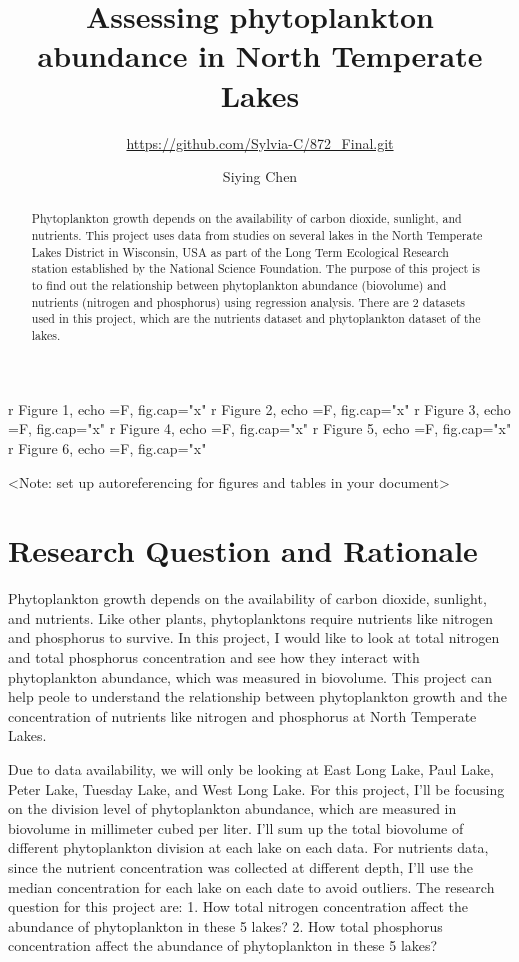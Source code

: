 \documentclass[12pt,]{article}
\title{Assessing phytoplankton abundance in North Temperate Lakes}
\subtitle{\url{https://github.com/Sylvia-C/872_Final.git}}
\author{Siying Chen}
\date{}
\begin{document}
\maketitle
\begin{abstract}
Phytoplankton growth depends on the availability of carbon dioxide,
sunlight, and nutrients. This project uses data from studies on several
lakes in the North Temperate Lakes District in Wisconsin, USA as part of
the Long Term Ecological Research station established by the National
Science Foundation. The purpose of this project is to find out the
relationship between phytoplankton abundance (biovolume) and nutrients
(nitrogen and phosphorus) using regression analysis. There are 2
datasets used in this project, which are the nutrients dataset and
phytoplankton dataset of the lakes.
\end{abstract}

\newpage

\tableofcontents  \newpage
\listoftables 

\newpage

\listoffigures 
{r Figure 1, echo =F, fig.cap="x"}
{r Figure 2, echo =F, fig.cap="x"}
{r Figure 3, echo =F, fig.cap="x"}
{r Figure 4, echo =F, fig.cap="x"}
{r Figure 5, echo =F, fig.cap="x"}
{r Figure 6, echo =F, fig.cap="x"} \newpage

\textless{}Note: set up autoreferencing for figures and tables in your
document\textgreater{}

\section{Research Question and
Rationale}\label{research-question-and-rationale}

Phytoplankton growth depends on the availability of carbon dioxide,
sunlight, and nutrients. Like other plants, phytoplanktons require
nutrients like nitrogen and phosphorus to survive. In this project, I
would like to look at total nitrogen and total phosphorus concentration
and see how they interact with phytoplankton abundance, which was
measured in biovolume. This project can help peole to understand the
relationship between phytoplankton growth and the concentration of
nutrients like nitrogen and phosphorus at North Temperate Lakes.

Due to data availability, we will only be looking at East Long Lake,
Paul Lake, Peter Lake, Tuesday Lake, and West Long Lake. For this
project, I'll be focusing on the division level of phytoplankton
abundance, which are measured in biovolume in millimeter cubed per
liter. I'll sum up the total biovolume of different phytoplankton
division at each lake on each data. For nutrients data, since the
nutrient concentration was collected at different depth, I'll use the
median concentration for each lake on each date to avoid outliers. The
research question for this project are: 1. How total nitrogen
concentration affect the abundance of phytoplankton in these 5 lakes? 2.
How total phosphorus concentration affect the abundance of phytoplankton
in these 5 lakes?
\end{document}
